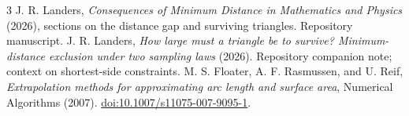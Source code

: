 \documentclass[11pt]{article}
\begin{document}


\begingroup\footnotesize
\begin{thebibliography}{3}
\footnotesize
\setlength{\itemsep}{0pt}
 J. R. Landers, \emph{Consequences of Minimum Distance
in Mathematics and Physics} (2026), sections on the distance gap and
surviving triangles. Repository manuscript.
 J. R. Landers, \emph{How large must a triangle be
to survive? Minimum-distance exclusion under two sampling laws} (2026).
Repository companion note; context on shortest-side constraints.
 M. S. Floater, A. F. Rasmussen, and U. Reif,
\emph{Extrapolation methods for approximating arc length and surface area},
Numerical Algorithms (2007). \href{https://doi.org/10.1007/s11075-007-9095-1}{doi:10.1007/s11075-007-9095-1}.
\end{thebibliography}
\endgroup
\end{document}

